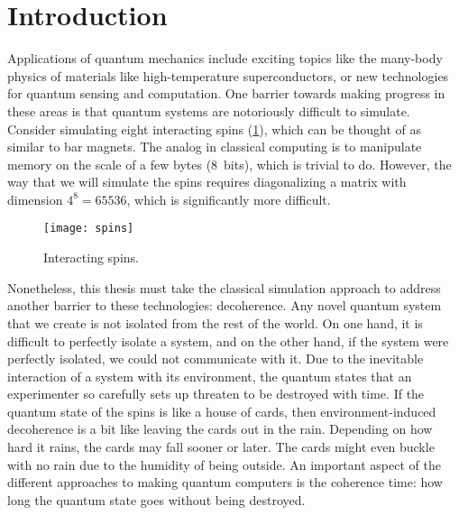 \chapter*{Introduction}

Applications of quantum mechanics include exciting topics like the many-body
physics of materials like high-temperature superconductors, or new technologies
for quantum sensing and computation. One barrier towards making progress in
these areas is that quantum systems are notoriously difficult to simulate.
Consider simulating eight interacting spins (\cref{fig:spins}), which can be
thought of as similar to bar magnets. The analog in classical computing is to
manipulate memory on the scale of a few bytes (\SI{8}{bits}), which is trivial
to do. However, the way that we will simulate the spins requires diagonalizing a
matrix with dimension $4^8 = \num{65536}$, which is significantly more
difficult.

\begin{figure}[ht]
  \centering
  \texttt{[image: spins]}
  \caption{%
    Interacting spins.
  }\label{fig:spins}
\end{figure}

Nonetheless, this thesis must take the classical simulation approach to address
another barrier to these technologies: decoherence. Any novel quantum system
that we create is not isolated from the rest of the world. On one hand, it is
difficult to perfectly isolate a system, and on the other hand, if the system
were perfectly isolated, we could not communicate with it. Due to the inevitable
interaction of a system with its environment, the quantum states that an
experimenter so carefully sets up threaten to be destroyed with time. If the
quantum state of the spins is like a house of cards, then environment-induced
decoherence is a bit like leaving the cards out in the rain. Depending on how
hard it rains, the cards may fall sooner or later. The cards might even buckle
with no rain due to the humidity of being outside. An important aspect of the
different approaches to making quantum computers is the coherence time: how long
the quantum state goes without being destroyed.

